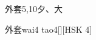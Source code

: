 \begin{entry}{外套}{5,10}{⼣、⼤}
  \begin{phonetics}{外套}{wai4 tao4}[][HSK 4]
  \end{phonetics}
\end{entry}
